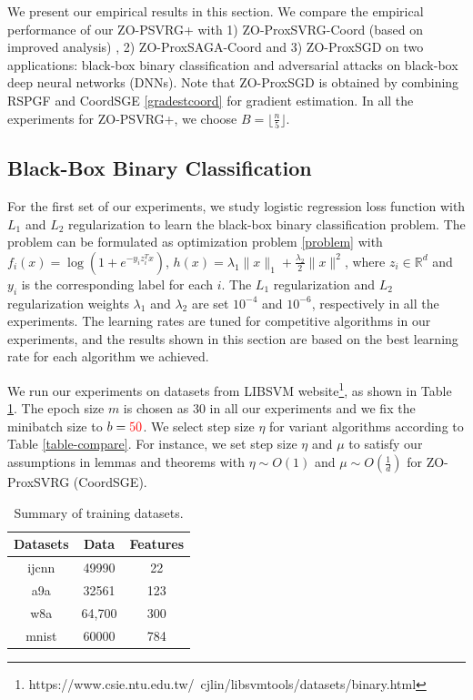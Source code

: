 \documentclass{article}
\newcommand*{\R}{\mathbb{R}}
\theoremstyle{definition}
\theoremstyle{remark}
\begin{document}
We present our empirical results in this section. We compare the empirical performance of
our ZO-PSVRG+  with 1) ZO-ProxSVRG-Coord (based on improved analysis) \cite{gu2018faster}, 2) ZO-ProxSAGA-Coord \cite{gu2018faster} and 3) ZO-ProxSGD \cite{ghadimi2016accelerated} on two applications: black-box binary classification and adversarial attacks on black-box deep neural networks
(DNNs). Note that ZO-ProxSGD is obtained by combining RSPGF and CoordSGE \eqref{gradestcoord} for gradient estimation. In all the experiments for ZO-PSVRG+, we choose $B = \lfloor{\frac{n}{5}}\rfloor$.

\subsection{Black-Box Binary Classification}
For the first set of our experiments, we study logistic regression loss function with $L_1$ and $L_2$ regularization {\color{Green} to learn the black-box binary classification problem}. The problem can be formulated as optimization problem \eqref{problem} with $f_i(x) = \log(1+e^{-y_iz^T_i{x}})$, $h(x) = \lambda_1\|{x}\|_1 + \frac{\lambda_2}{2}\|{x}\|^2$, where $z_i\in\R^d$ and $y_i$ is the corresponding label for each $i$. The $L_1$ regularization and $L_2$ regularization weights $\lambda_1$ and $\lambda_2$ are set {\color{red} $10^{-4}$} and {\color{red} $10^{-6}$}, respectively in all the experiments. The learning rates are tuned for competitive algorithms in our experiments, and the results shown in this section are based on the best learning rate for each algorithm we achieved.


We run our experiments on datasets from LIBSVM website{\footnote{https://www.csie.ntu.edu.tw/~cjlin/libsvmtools/datasets/binary.html}}, as shown in Table \ref{metadata}. The epoch size $m$ is chosen as {\color{red} 30} in all our experiments {\color{red} and we fix the minibatch size to $b = {\color{red} 50}$}. We select step size $\eta$ for variant algorithms according to Table \ref{table-compare}. For instance, we set step size $\eta$ and $\mu$ to satisfy our assumptions in lemmas and theorems with $\eta\sim O(1)$ and $\mu\sim O(\frac{1}{d})$ for ZO-ProxSVRG (CoordSGE).

\begin{table}[htbp]
\begin{center}
\caption{Summary of training datasets.}
\begin{tabular}{ c|c|c } 
 \hline
 Datasets &  Data & Features \\ 
 \hline
  ijcnn & 49990 & 22 \\
  a9a & 32561 & 123 \\ 
 w8a & 64,700  & 300 \\ 
 mnist & 60000 & 784 \\
 \hline
\end{tabular}
\label{metadata}
\end{center}
\end{table}
\end{document}
